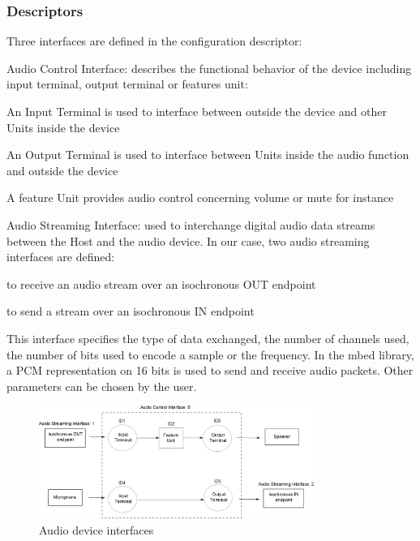 \documentclass[pdftex,10pt,a4paper]{report}
\newenvironment{packed_item}{
\begin{itemize}
  \setlength{\itemsep}{1pt}
  \setlength{\parskip}{0pt}
  \setlength{\parsep}{0pt}
}{\end{itemize}}
\begin{document}
\subsubsection{Descriptors}
Three interfaces are defined in the configuration descriptor:
\begin{packed_item}
	\item Audio Control Interface: describes the functional behavior of the device including input terminal, output terminal or features unit:
	\begin{packed_item}
		\item An Input Terminal is used to interface between outside the device and other Units inside the device
		\item An Output Terminal is used to interface between Units inside the audio function and outside the device
		\item A feature Unit provides audio control concerning volume or mute for instance
	\end{packed_item}
	
	\item Audio Streaming Interface: used to interchange digital audio data streams between the Host and the audio device. In our case, two audio streaming interfaces are defined:
	\begin{packed_item}
		\item to receive an audio stream over an isochronous OUT endpoint
		\item to send a stream over an isochronous IN endpoint
	\end{packed_item}
	This interface specifies the type of data exchanged, the number of channels used, the number of bits used to encode a sample or the frequency. In the mbed library, a PCM representation on 16 bits is used to send and receive audio packets. Other parameters can be chosen by the user.
\end{packed_item}

\begin{figure}[h!]
		\centering
		\includegraphics[width=0.8\textwidth]{./audio_archi.png}
		\caption{Audio device interfaces}
		\label{Audio device interfaces}
\end{figure}
\end{document}
